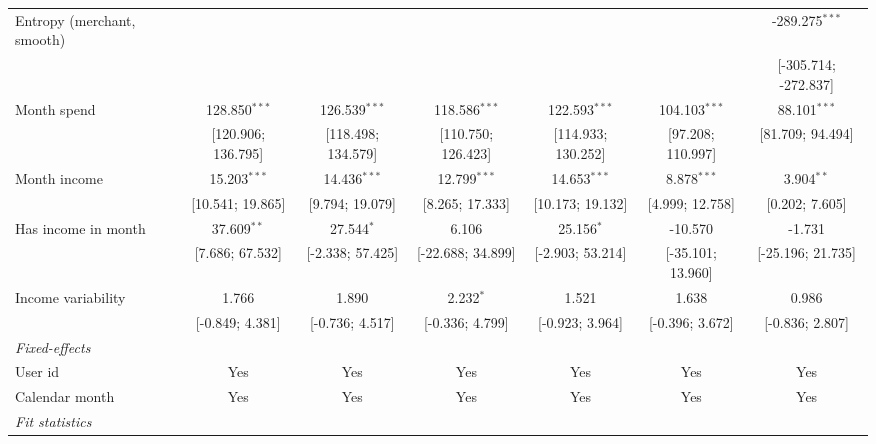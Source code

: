 \begin{table}[htbp]
\begin{threeparttable}[b]
\begin{tabular}{lcccccc}
         Entropy (merchant, smooth) &                    &                    &                    &                      &                      & -289.275$^{***}$\\   
                                    &                    &                    &                    &                      &                      & [-305.714; -272.837]\\   
         Month spend                & 128.850$^{***}$    & 126.539$^{***}$    & 118.586$^{***}$    & 122.593$^{***}$      & 104.103$^{***}$      & 88.101$^{***}$\\   
                                    & [120.906; 136.795] & [118.498; 134.579] & [110.750; 126.423] & [114.933; 130.252]   & [97.208; 110.997]    & [81.709; 94.494]\\   
         Month income               & 15.203$^{***}$     & 14.436$^{***}$     & 12.799$^{***}$     & 14.653$^{***}$       & 8.878$^{***}$        & 3.904$^{**}$\\   
                                    & [10.541; 19.865]   & [9.794; 19.079]    & [8.265; 17.333]    & [10.173; 19.132]     & [4.999; 12.758]      & [0.202; 7.605]\\   
         Has income in month        & 37.609$^{**}$      & 27.544$^{*}$       & 6.106              & 25.156$^{*}$         & -10.570              & -1.731\\   
                                    & [7.686; 67.532]    & [-2.338; 57.425]   & [-22.688; 34.899]  & [-2.903; 53.214]     & [-35.101; 13.960]    & [-25.196; 21.735]\\   
         Income variability         & 1.766              & 1.890              & 2.232$^{*}$        & 1.521                & 1.638                & 0.986\\   
                                    & [-0.849; 4.381]    & [-0.736; 4.517]    & [-0.336; 4.799]    & [-0.923; 3.964]      & [-0.396; 3.672]      & [-0.836; 2.807]\\   
         \midrule
         \emph{Fixed-effects}\\
         User id                    & Yes                & Yes                & Yes                & Yes                  & Yes                  & Yes\\  
         Calendar month             & Yes                & Yes                & Yes                & Yes                  & Yes                  & Yes\\  
         \midrule
         \emph{Fit statistics}\\

\end{tabular}
\end{threeparttable}
\end{table}
